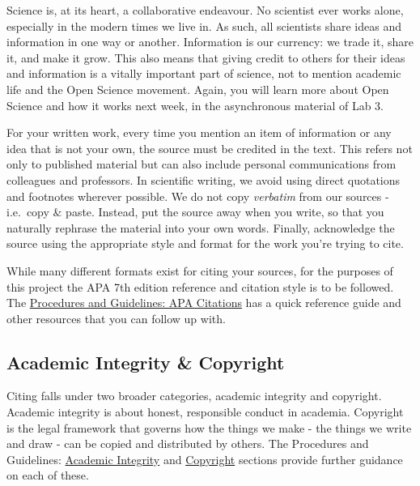 \documentclass[
]{book}
\begin{document}
Science is, at its heart, a collaborative endeavour. No scientist ever works alone, especially in the modern times we live in. As such, all scientists share ideas and information in one way or another. Information is our currency: we trade it, share it, and make it grow. This also means that giving credit to others for their ideas and information is a vitally important part of science, not to mention academic life and the Open Science movement. Again, you will learn more about Open Science and how it works next week, in the asynchronous material of Lab 3.

For your written work, every time you mention an item of information or any idea that is not your own, the source must be credited in the text. This refers not only to published material but can also include personal communications from colleagues and professors. In scientific writing, we avoid using direct quotations and footnotes wherever possible. We do not copy \emph{verbatim} from our sources - i.e.~copy \& paste. Instead, put the source away when you write, so that you naturally rephrase the material into your own words. Finally, acknowledge the source using the appropriate style and format for the work you're trying to cite.

While many different formats exist for citing your sources, for the purposes of this project the APA 7th edition reference and citation style is to be followed. The \href{https://ubco-biology.github.io/Procedures-and-Guidelines/apa-citations.html}{Procedures and Guidelines: APA Citations} has a quick reference guide and other resources that you can follow up with.

\hypertarget{academic-integrity-copyright}{%
\subsection*{Academic Integrity \& Copyright}\label{academic-integrity-copyright}}

Citing falls under two broader categories, academic integrity and copyright. Academic integrity is about honest, responsible conduct in academia. Copyright is the legal framework that governs how the things we make - the things we write and draw - can be copied and distributed by others. The Procedures and Guidelines: \href{https://ubco-biology.github.io/Procedures-and-Guidelines/academic-integrity.html}{Academic Integrity} and \href{https://ubco-biology.github.io/Procedures-and-Guidelines/copyright-1.html}{Copyright} sections provide further guidance on each of these.
\end{document}
